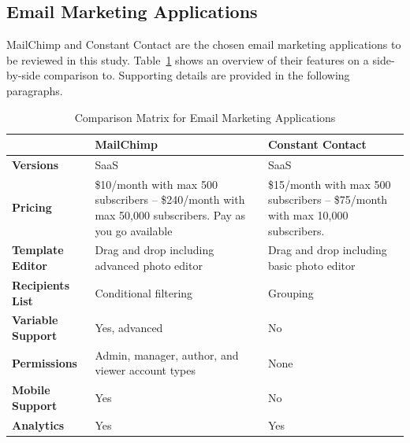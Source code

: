 \clearpage

\subsection{Email Marketing Applications}
\label{subsec:3.3.3:EmaiMarktAppl}

MailChimp and Constant Contact are the chosen email marketing applications to be reviewed in this study. Table~\ref{tab:comp_matr_emai} shows an overview of their features on a side-by-side comparison to. Supporting details are provided in the following paragraphs.

\begin{table}[H]
\begin{center}
	\caption[Comparison Matrix for Email Marketing Applications]{Comparison Matrix for Email Marketing Applications} \label{tab:comp_matr_emai}
    \begin{tabular}{ | p{3cm} | p{5cm} | p{5cm} | }
	\hline
	& \textbf{MailChimp} & \textbf{Constant Contact} \\ \hline
	\textbf{Versions} & SaaS & SaaS \\ \hline
	\textbf{Pricing} & \$10/month with max 500 subscribers -- \$240/month with max 50,000 subscribers. Pay as you go available & \$15/month with max 500 subscribers -- \$75/month with max 10,000 subscribers. \\ \hline
	\textbf{Template Editor} & Drag and drop including advanced photo editor & Drag and drop including basic photo editor \\ \hline
	\textbf{Recipients List} & Conditional filtering & Grouping \\ \hline
	\textbf{Variable Support} & Yes, advanced & No \\ \hline
	\textbf{Permissions} & Admin, manager, author, and viewer account types & None \\ \hline
	\textbf{Mobile Support} & Yes & No \\ \hline
	\textbf{Analytics} & Yes & Yes \\ \hline
    \end{tabular}
\end{center}
\end{table}

